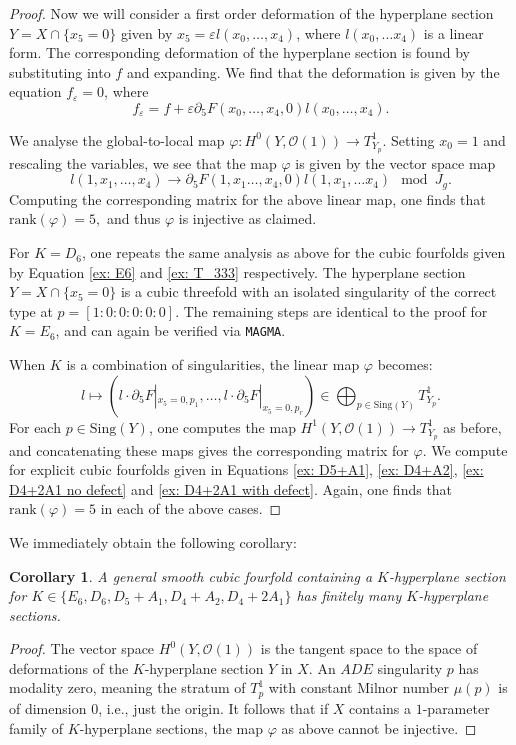 \documentclass[12pt]{amsart}
\numberwithin{equation}{section}
\theoremstyle{plain}
\newtheorem{corollary}[equation]{Corollary}
\theoremstyle{remark}
\theoremstyle{definition}
\newcommand{\calO}{\mathcal{O}}
\newcommand{\Sing}{\mathrm{Sing}}
\newcommand{\rank}{\mathrm{rank}}
\begin{document}
\begin{proof}
    Now we will consider a first order deformation of the hyperplane section $Y=X\cap\{x_5=0\}$ given by $x_5=\varepsilon l(x_0,\ldots,x_4)$, where $l(x_0,\dots x_4)$ is a linear form. The corresponding deformation of the hyperplane section is found by substituting into $f$ and expanding. We find that the deformation is given by the equation $f_{\varepsilon}=0$, where
    \[
        f_{\varepsilon}=f+
        \varepsilon\partial_5F(x_0,\ldots,x_4,0)l(x_0,\ldots,x_4).
    \]

   We analyse the global-to-local map $\varphi:H^0(Y,\calO(1))\rightarrow T^1_{Y_p}$.     
    Setting $x_0=1$ and rescaling the variables, we see that the map $\varphi$ is given by the vector space map
    \[
       l(1,x_1,\dots, x_4) \rightarrow \partial_5F(1,x_1\dots,x_4,0)l(1,x_1,\dots x_4) \mod J_g.
    \]
   Computing the corresponding matrix for the above linear map, one finds that $\rank(\varphi)=5, $ and thus $\varphi$ is injective as claimed. 
    
    For $K=D_6$, one repeats the same analysis as above for the cubic fourfolds given by Equation \ref{ex: E6} and \ref{ex: T_333} respectively. The hyperplane section $Y=X\cap\{x_5=0\}$ is a cubic threefold with an isolated singularity of the correct type at $p=[1:0:0:0:0:0]$. The remaining steps are identical to the proof for $K=E_6$, and can again be verified via \verb|MAGMA|.

    When $K$ is a combination of singularities, the linear map $\varphi$ becomes:
    $$l\mapsto (l\cdot \partial_5F|_{x_5=0, p_1},\dots, l\cdot \partial_5F|_{x_5=0, p_r}) \in \bigoplus_{p\in \Sing(Y)} T^1_{Y_p}.$$ For each $p\in \Sing(Y)$, one computes the map $H^1(Y,\calO(1))\rightarrow T_{Y_p}^1$ as before, and concatenating these maps gives the corresponding matrix for $\varphi.$ We compute for explicit cubic fourfolds given in Equations \ref{ex: D5+A1}, \ref{ex: D4+A2}, \ref{ex: D4+2A1 no defect} and \ref{ex: D4+2A1 with defect}. Again, one finds that $\rank(\varphi)=5$ in each of the above cases.
\end{proof}

We immediately obtain the following corollary:

\begin{corollary} \label{E6 discrete fibers}
    A general smooth cubic fourfold containing a $K$-hyperplane section for $K\in \{E_6, D_6,D_5+A_1, D_4+A_2,D_4+2A_1\}$ has finitely many $K$-hyperplane sections.
\end{corollary}
\begin{proof}
    The vector space $H^0(Y, \calO(1))$ is the tangent space to the space of deformations of the $K$-hyperplane section $Y$ in $X$. An $ADE$ singularity $p$ has modality zero, meaning the stratum of $T^1_p$ with constant Milnor number $\mu(p)$ is of dimension $0$, i.e., just the origin. It follows that if $X$ contains a $1$-parameter family of $K$-hyperplane sections, the map $\varphi$ as above cannot be injective.
\end{proof}
\end{document}
